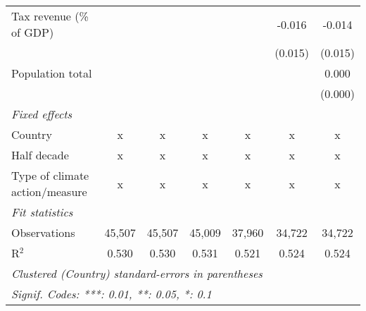 \begin{tabular}{lcccccc}
   Tax revenue (\% of GDP)                &         &              &              &              & -0.016       & -0.014\\   
                                          &         &              &              &              & (0.015)      & (0.015)\\   
   Population total                       &         &              &              &              &              & 0.000\\   
                                          &         &              &              &              &              & (0.000)\\   
   \emph{Fixed effects}\\
   Country                                & x       & x            & x            & x            & x            & x\\  
   Half decade                            & x       & x            & x            & x            & x            & x\\  
   Type of climate action/measure         & x       & x            & x            & x            & x            & x\\  
   \midrule \emph{Fit statistics}\\
   Observations                           & 45,507  & 45,507       & 45,009       & 37,960       & 34,722       & 34,722\\  
   R$^2$                                  & 0.530   & 0.530        & 0.531        & 0.521        & 0.524        & 0.524\\  
   \midrule
   \multicolumn{7}{l}{\emph{Clustered (Country) standard-errors in parentheses}}\\
   \multicolumn{7}{l}{\emph{Signif. Codes: ***: 0.01, **: 0.05, *: 0.1}}\\
\end{tabular}
\par\endgroup


